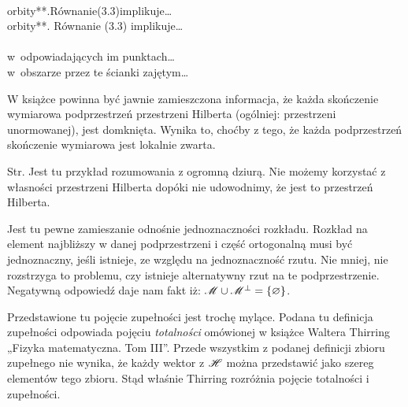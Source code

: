 \documentclass[a4paper,11pt]{article}
\begin{document}
\noindent
{} \\
\Jest  orbity**.Równanie(3.3)implikuje\ldots \\
\Powin orbity**. Równanie (3.3) implikuje\ldots \\
 \\
\Jest  w~odpowiadających im punktach\ldots  \\
\Powin w~obszarze przez te ścianki zajętym\ldots \\


\vspace{\spaceTwo}














W książce powinna być jawnie zamieszczona informacja, że każda skończenie wymiarowa
podprzestrzeń przestrzeni Hilberta (ogólniej: przestrzeni unormowanej), jest
domknięta. Wynika to, choćby z tego, że każda podprzestrzeń
skończenie wymiarowa jest lokalnie zwarta.

\vspace{\spaceFour}



Str. Jest tu przykład rozumowania z ogromną dziurą. Nie możemy
korzystać z własności przestrzeni Hilberta dopóki nie udowodnimy, że
jest to przestrzeń Hilberta.

\vspace{\spaceFour}



 Jest tu pewne zamieszanie odnośnie jednoznaczności
rozkładu. Rozkład na element najbliższy w danej podprzestrzeni i
część ortogonalną musi być jednoznaczny, jeśli istnieje, ze względu
na jednoznaczność rzutu. Nie mniej, nie rozstrzyga to problemu, czy
istnieje alternatywny rzut na te podprzestrzenie. Negatywną odpowiedź
daje nam fakt iż:
$\mathcal{M} \cup \mathcal{M}^{ \bot } = \{ \varnothing \}$.

\vspace{\spaceFour}



 Przedstawione tu pojęcie zupełności jest trochę
mylące. Podana tu definicja zupełności odpowiada pojęciu
\textit{totalności} omówionej w książce Waltera Thirring „Fizyka
matematyczna. Tom III”. Przede wszystkim z podanej definicji zbioru
zupełnego nie wynika, że każdy wektor z $\mathcal{H}$ można
przedstawić jako szereg elementów tego zbioru. Stąd właśnie Thirring
rozróżnia pojęcie totalności i zupełności.
\end{document}
